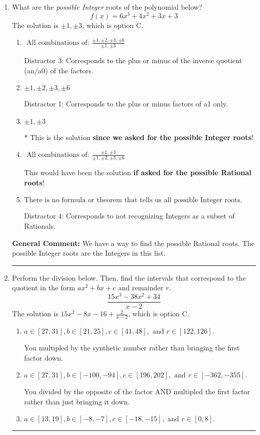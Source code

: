 \documentclass{extbook}[14pt]
\newcommand{\litem}[1]{\item #1

\rule{\textwidth}{0.4pt}}
\begin{document}
\begin{enumerate}\litem{
What are the \textit{possible Integer} roots of the polynomial below?
\[ f(x) = 6x^{3} +4 x^{2} +3 x + 3 \]The solution is \( \pm 1,\pm 3 \), which is option C.\begin{enumerate}[label=\Alph*.]
\item \( \text{ All combinations of: }\frac{\pm 1,\pm 2,\pm 3,\pm 6}{\pm 1,\pm 3} \)

 Distractor 3: Corresponds to the plus or minus of the inverse quotient (an/a0) of the factors. 
\item \( \pm 1,\pm 2,\pm 3,\pm 6 \)

 Distractor 1: Corresponds to the plus or minus factors of a1 only.
\item \( \pm 1,\pm 3 \)

* This is the solution \textbf{since we asked for the possible Integer roots}!
\item \( \text{ All combinations of: }\frac{\pm 1,\pm 3}{\pm 1,\pm 2,\pm 3,\pm 6} \)

This would have been the solution \textbf{if asked for the possible Rational roots}!
\item \( \text{There is no formula or theorem that tells us all possible Integer roots.} \)

 Distractor 4: Corresponds to not recognizing Integers as a subset of Rationals.
\end{enumerate}

\textbf{General Comment:} We have a way to find the possible Rational roots. The possible Integer roots are the Integers in this list.
}
\litem{
Perform the division below. Then, find the intervals that correspond to the quotient in the form $ax^2+bx+c$ and remainder $r$.
\[ \frac{15x^{3} -38 x^{2} + 34}{x -2} \]The solution is \( 15x^{2} -8 x -16 + \frac{2}{x -2} \), which is option C.\begin{enumerate}[label=\Alph*.]
\item \( a \in [27, 31], b \in [21, 25], c \in [41, 48], \text{ and } r \in [122, 126]. \)

 You multipled by the synthetic number rather than bringing the first factor down.
\item \( a \in [27, 31], b \in [-100, -94], c \in [196, 202], \text{ and } r \in [-362, -355]. \)

 You divided by the opposite of the factor AND multipled the first factor rather than just bringing it down.
\item \( a \in [13, 19], b \in [-8, -7], c \in [-18, -15], \text{ and } r \in [0, 8]. \)


\end{enumerate}}
\end{enumerate}
\end{document}

